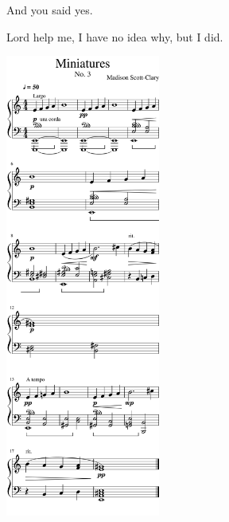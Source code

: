 \begin{paracol}{2}
\begin{leftcolumn}
\begin{ally}
And you said yes.
\end{ally}
Lord help me, I have no idea why, but I did.
\newpage
\end{leftcolumn}
\begin{rightcolumn*}
  \begin{flushright}
\noindent\includegraphics[width=2in]{assets/static/miniatures/3-1.png}
\end{flushright}


\end{rightcolumn*}
\end{paracol}
